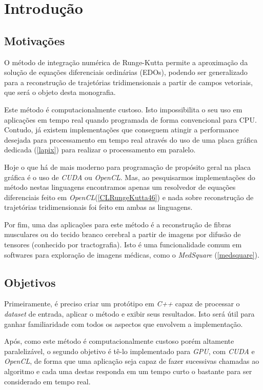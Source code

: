 \chapter{Introdução}

\section{Motivações}
O método de integração numérica de Runge-Kutta permite a aproximação da solução de equações diferenciais ordinárias (EDOs), podendo ser generalizado para a reconstrução de trajetórias tridimensionais a partir de campos vetoriais, que será o objeto desta monografia.

Este método é computacionalmente custoso. Isto impossibilita o seu uso em aplicações em tempo real quando programada de forma convencional para CPU. Contudo, já existem implementações que conseguem atingir a performance desejada para processamento em tempo real através do uso de uma placa gráfica dedicada (\ref{lapix}) para realizar o processamento em paralelo.

Hoje o que há de mais moderno para programação de propósito geral na placa gráfica é o uso de \textit{CUDA} ou \textit{OpenCL}. Mas, ao pesquisarmos implementações do método nestas linguagens encontramos apenas um resolvedor de equações diferenciais feito em \textit{OpenCL}(\ref{CLRungeKutta46}) e nada sobre reconstrução de trajetórias tridimensionais foi feito em ambas as linguagens.

Por fim, uma das aplicações para este método é a reconstrução de fibras musculares ou do tecido branco cerebral a partir de imagens por difusão de tensores (conhecido por tractografia). Isto é uma funcionalidade comum em softwares para exploração de imagens médicas, como o \textit{MedSquare} (\ref{medsquare}).

\section{Objetivos}
Primeiramente, é preciso criar um protótipo em \textit{C++} capaz de processar o \textit{dataset} de entrada, aplicar o método e exibir seus resultados. Isto será útil para ganhar familiaridade com todos os aspectos que envolvem a implementação.

\newpage
Após, como este método é computacionalmente custoso porém altamente paralelizável, o segundo objetivo é tê-lo implementado para \textit{GPU}, com \textit{CUDA} e \textit{OpenCL}, de forma que uma aplicação seja capaz de fazer sucessivas chamadas ao algoritmo e cada uma destas responda em um tempo curto o bastante para ser considerado em tempo real.

